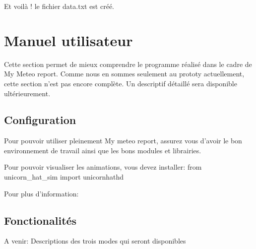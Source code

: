 \documentclass[letterpaper,10pt,english]{sphinxmanual}
\begin{document}
\sphinxAtStartPar
Et voilà ! le fichier data.txt est créé.

\sphinxstepscope


\section{Manuel utilisateur}
\label{\detokenize{manuel_utilisateur:manuel-utilisateur}}\label{\detokenize{manuel_utilisateur::doc}}
\sphinxAtStartPar
Cette section permet de mieux comprendre le programme réalisé dans le cadre de My Meteo report.
Comme nous en sommes seulement au prototy actuellement, cette section n’est pas encore complète. Un descriptif détaillé sera
disponible ultérieurement.


\subsection{Configuration}
\label{\detokenize{manuel_utilisateur:configuration}}
\sphinxAtStartPar
Pour pouvoir utiliser pleinement My meteo report, assurez vous d’avoir le bon environnement de travail ainsi que les bons modules et
librairies.

\sphinxAtStartPar
Pour pouvoir visualiser les animations, vous devez installer:  from unicorn\_hat\_sim import unicornhathd

\sphinxAtStartPar
Pour plus d’information: 


\subsection{Fonctionalités}
\label{\detokenize{manuel_utilisateur:fonctionalites}}
\sphinxAtStartPar
A venir:
Descriptions des trois modes qui seront disponibles



\renewcommand{\indexname}{Index}
\printindex
\end{document}
